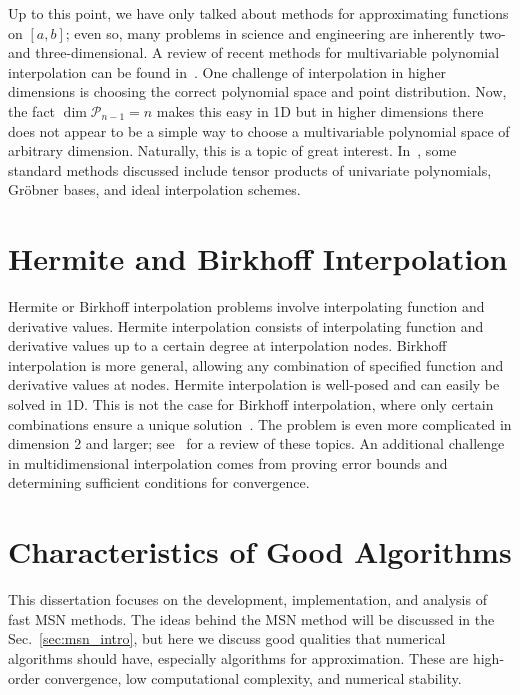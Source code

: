 Up to this point, we have only talked about methods for approximating
functions on $[a,b]$; even so, many problems in science and engineering
are inherently two- and three-dimensional.
A review of recent methods for multivariable polynomial interpolation
can be found in~\cite{gasca2001history,gasca2000polynomial}.
One challenge of interpolation in higher dimensions is choosing 
the correct polynomial space and point distribution.
Now, the fact $\dim \mathcal{P}_{n-1}=n$ makes this easy in 1D
but in higher dimensions there does not appear to be a simple way to
choose a multivariable polynomial space of arbitrary dimension.
Naturally, this is a topic of great interest.
In~\cite{gasca2000polynomial}, some standard methods discussed include
tensor products of univariate polynomials, Gr\"{o}bner bases,
and ideal interpolation schemes.



\section{Hermite and Birkhoff Interpolation}
\label{sec:Birkhoff_MD}

Hermite or Birkhoff interpolation problems involve interpolating
function and derivative values.
Hermite interpolation consists of interpolating function and derivative
values up to a certain degree at interpolation nodes.
Birkhoff interpolation is more general, allowing any combination
of specified function and derivative values at nodes.
Hermite interpolation is well-posed and can easily be solved in 1D.
This is not the case for Birkhoff interpolation, where only
certain combinations ensure a unique
solution~\cite{karlin1972hermite,lorentz1971birkhoff}.
The problem is even more complicated in dimension 2 and larger;
see~\cite{lorentz2000multivariate,rudy} for a review of these topics.
An additional challenge in multidimensional interpolation
comes from proving error bounds and determining sufficient conditions for
convergence.



\section{Characteristics of Good Algorithms}
\label{sec:Good_Alg_Details}

This dissertation focuses on the development, implementation,
and analysis of fast MSN methods. The ideas behind the MSN method
will be discussed in the Sec.~\ref{sec:msn_intro}, but here
we discuss good qualities that numerical algorithms should have,
especially algorithms for approximation.
These are high-order convergence, low computational complexity,
and numerical stability.

